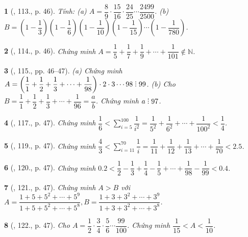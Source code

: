 \documentclass{article}
\newtheorem{baitoan}{}
\DeclareRobustCommand{\divby}{%
	\mathrel{\vbox{\baselineskip.65ex\lineskiplimit0pt\hbox{.}\hbox{.}\hbox{.}}}%
}
\begin{document}
\begin{baitoan}[\cite{Binh_Toan_6_tap_2}, 113., p. 46]
	Tính: (a) $A = \dfrac{8}{9}\cdot\dfrac{15}{16}\cdot\dfrac{24}{25}\cdots\dfrac{2499}{2500}$. (b) $B = \left(1 - \dfrac{1}{3}\right)\left(1 - \dfrac{1}{6}\right)\left(1 - \dfrac{1}{10}\right)\left(1 - \dfrac{1}{15}\right)\cdots\left(1 - \dfrac{1}{780}\right)$.
\end{baitoan}

\begin{baitoan}[\cite{Binh_Toan_6_tap_2}, 114., p. 46]
	Chứng minh $A = \dfrac{1}{5} + \dfrac{1}{7} + \dfrac{1}{9} + \cdots + \dfrac{1}{101}\notin\mathbb{N}$.
\end{baitoan}

\begin{baitoan}[\cite{Binh_Toan_6_tap_2}, 115., pp. 46--47]
	(a) Chứng minh $A = \left(\dfrac{1}{1} + \dfrac{1}{2} + \dfrac{1}{3} + \cdots + \dfrac{1}{98}\right)\cdot2\cdot3\cdots98\divby99$. (b) Cho $B = \dfrac{1}{1} + \dfrac{1}{2} + \dfrac{1}{3} + \cdots + \dfrac{1}{96} = \dfrac{a}{b}$. Chứng minh $a\divby97$.
\end{baitoan}

\begin{baitoan}[\cite{Binh_Toan_6_tap_2}, 117., p. 47]
	Chứng minh $\dfrac{1}{6} < \sum_{i=5}^{100} \dfrac{1}{i^2} = \dfrac{1}{5^2} + \dfrac{1}{6^2} + \cdots + \dfrac{1}{100^2} < \dfrac{1}{4}$.
\end{baitoan}

\begin{baitoan}[\cite{Binh_Toan_6_tap_2}, 119., p. 47]
	Chứng minh $\dfrac{4}{3} < \sum_{i=11}^{70} \dfrac{1}{i} = \dfrac{1}{11} + \dfrac{1}{12} + \dfrac{1}{13} + \cdots + \dfrac{1}{70} < 2.5$.
\end{baitoan}

\begin{baitoan}[\cite{Binh_Toan_6_tap_2}, 120., p. 47]
	Chứng minh $0.2 < \dfrac{1}{2} - \dfrac{1}{3} + \dfrac{1}{4} - \dfrac{1}{5} + \cdots + \dfrac{1}{98} - \dfrac{1}{99} < 0.4$.
\end{baitoan}

\begin{baitoan}[\cite{Binh_Toan_6_tap_2}, 121., p. 47]
	Chứng minh $A > B$ với $A = \dfrac{1 + 5 + 5^2 + \cdots + 5^9}{1 + 5 + 5^2 + \cdots + 5^8},B = \dfrac{1 + 3 + 3^2 + \cdots + 3^9}{1 + 3 + 3^2 + \cdots + 3^8}$. 
\end{baitoan}

\begin{baitoan}[\cite{Binh_Toan_6_tap_2}, 122., p. 47]
	Cho $A = \dfrac{1}{2}\cdot\dfrac{3}{4}\cdot\dfrac{5}{6}\cdots\dfrac{99}{100}$. Chứng minh $\dfrac{1}{15} < A < \dfrac{1}{10}$.
\end{baitoan}
\end{document}
